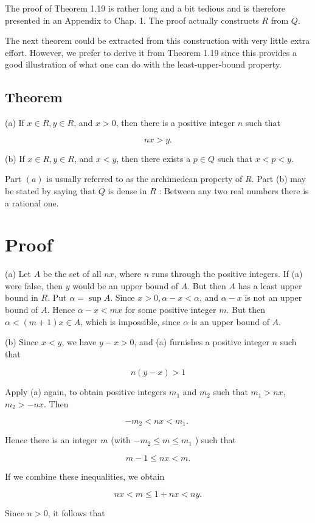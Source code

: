 \documentclass[10pt]{article}
\begin{document}
The proof of Theorem 1.19 is rather long and a bit tedious and is therefore presented in an Appendix to Chap. 1. The proof actually constructs $R$ from $Q$.

The next theorem could be extracted from this construction with very little extra effort. However, we prefer to derive it from Theorem 1.19 since this provides a good illustration of what one can do with the least-upper-bound property.

\subsection{Theorem}
(a) If $x \in R, y \in R$, and $x>0$, then there is a positive integer $n$ such that

$$
n x>y .
$$

(b) If $x \in R, y \in R$, and $x<y$, then there exists a $p \in Q$ such that $x<p<y$.

Part $(a)$ is usually referred to as the archimedean property of $R$. Part (b) may be stated by saying that $Q$ is dense in $R$ : Between any two real numbers there is a rational one.

\section{Proof}
(a) Let $A$ be the set of all $n x$, where $n$ runs through the positive integers. If (a) were false, then $y$ would be an upper bound of $A$. But then $A$ has a least upper bound in $R$. Put $\alpha=\sup A$. Since $x>0, \alpha-x<\alpha$, and $\alpha-x$ is not an upper bound of $A$. Hence $\alpha-x<m x$ for some positive integer $m$. But then $\alpha<(m+1) x \in A$, which is impossible, since $\alpha$ is an upper bound of $A$.

(b) Since $x<y$, we have $y-x>0$, and (a) furnishes a positive integer $n$ such that

$$
n(y-x)>1
$$

Apply (a) again, to obtain positive integers $m_{1}$ and $m_{2}$ such that $m_{1}>n x$, $m_{2}>-n x$. Then

$$
-m_{2}<n x<m_{1} \text {. }
$$

Hence there is an integer $m$ (with $-m_{2} \leq m \leq m_{1}$ ) such that

$$
m-1 \leq n x<m .
$$

If we combine these inequalities, we obtain

$$
n x<m \leq 1+n x<n y .
$$

Since $n>0$, it follows that
\end{document}
